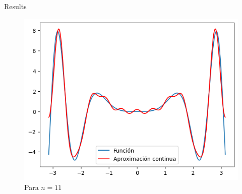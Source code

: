 \begin{frame}{Results}
    \begin{figure}
        \centering
        \includegraphics[width=.5\paperwidth]{p13-A-cont3.png}
        \caption{Para $n=11$}
        \label{fig:enter-label}
    \end{figure}
\end{frame}